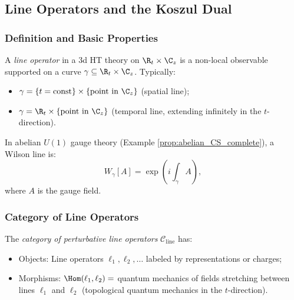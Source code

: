 \subsection{Line Operators and the Koszul Dual}

\subsubsection{Definition and Basic Properties}

\begin{definition}
\label{def:line_operators}
A \emph{line operator} in a 3d HT theory on $\R_t \times \C_z$ is a non-local observable supported on a curve $\gamma \subseteq \R_t \times \C_z$. Typically:
\begin{itemize}
\item $\gamma = \{t = \text{const}\} \times \{\text{point in } \C_z\}$ (spatial line);
\item $\gamma = \R_t \times \{\text{point in } \C_z\}$ (temporal line, extending infinitely in the $t$-direction).
\end{itemize}
\end{definition}

\begin{example}
In abelian $U(1)$ gauge theory (Example \ref{prop:abelian_CS_complete}), a Wilson line is:
\begin{equation}
W_\gamma[A] = \exp\left(i \int_\gamma A\right),
\end{equation}
where $A$ is the gauge field.
\end{example}

\subsubsection{Category of Line Operators}

\begin{definition}
\label{def:line_category}
The \emph{category of perturbative line operators} $\mathcal{C}_{\text{line}}$ has:
\begin{itemize}
\item Objects: Line operators $\ell_1, \ell_2, \ldots$ labeled by representations or charges;
\item Morphisms: $\Hom(\ell_1, \ell_2) = $ quantum mechanics of fields stretching between lines $\ell_1$ and $\ell_2$ (topological quantum mechanics in the $t$-direction).
\end{itemize}
\end{definition}

